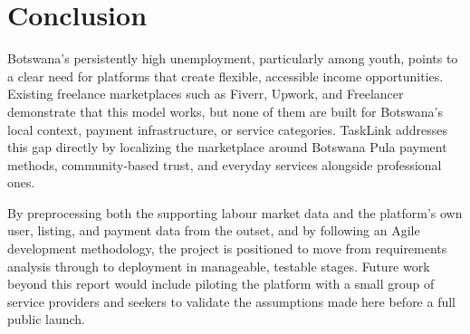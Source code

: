 \documentclass[12pt]{article}
\begin{document}
\section{Conclusion}
Botswana's persistently high unemployment, particularly among youth, points to a clear need for platforms that create flexible, accessible income opportunities. Existing freelance marketplaces such as Fiverr, Upwork, and Freelancer demonstrate that this model works, but none of them are built for Botswana's local context, payment infrastructure, or service categories. TaskLink addresses this gap directly by localizing the marketplace around Botswana Pula payment methods, community-based trust, and everyday services alongside professional ones.

By preprocessing both the supporting labour market data and the platform's own user, listing, and payment data from the outset, and by following an Agile development methodology, the project is positioned to move from requirements analysis through to deployment in manageable, testable stages. Future work beyond this report would include piloting the platform with a small group of service providers and seekers to validate the assumptions made here before a full public launch.



\end{document}
